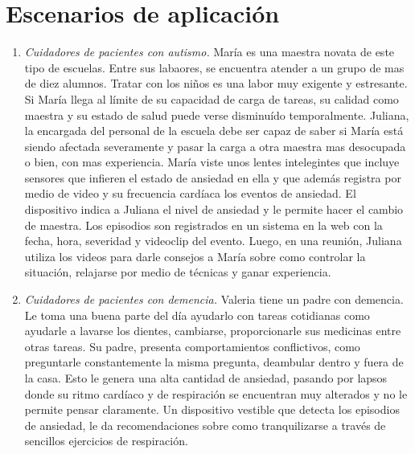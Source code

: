 \documentclass[letterpaper,12pt]{cicese}
\begin{document}
			\section{Escenarios de aplicaci\'on}
				\begin{enumerate}
					\item \emph{Cuidadores de pacientes con autismo.}
					Mar\'ia es una maestra novata de este tipo de escuelas. Entre sus labaores, se encuentra
					atender a un grupo de mas de diez alumnos. Tratar con los ni\~nos es una labor muy exigente y estresante. Si Mar\'ia llega al l\'imite de su capacidad
					de carga de tareas, su calidad como maestra y su estado de salud puede verse disminu\'ido temporalmente. Juliana, la encargada del personal de la
					escuela debe ser capaz de saber si Mar\'ia est\'a siendo afectada severamente y pasar la carga a otra maestra mas desocupada o bien, con mas experiencia. Mar\'ia
					viste unos lentes intelegintes que incluye sensores que infieren el estado de ansiedad en ella y que adem\'as registra por medio de video y su
					frecuencia card\'iaca los eventos de ansiedad. El dispositivo indica a Juliana el nivel de ansiedad y le permite hacer el cambio de maestra. Los episodios son registrados
					en un sistema en la web con la fecha, hora, severidad y videoclip del evento. Luego,
					en una reuni\'on, Juliana utiliza los videos para darle consejos a Mar\'ia sobre como controlar la situaci\'on, relajarse por medio de t\'ecnicas
					y ganar experiencia.
					\item \emph{Cuidadores de pacientes con demencia.}
						Valeria tiene un padre con demencia. Le toma una buena parte del d\'ia ayudarlo
						con tareas cotidianas como ayudarle a lavarse los dientes, cambiarse, proporcionarle sus medicinas entre
						otras tareas. Su padre, presenta comportamientos conflictivos, como preguntarle constantemente la misma pregunta, deambular dentro y fuera de la casa. Esto le genera una alta cantidad de ansiedad, pasando por lapsos donde su ritmo card\'iaco y de respiraci\'on se encuentran muy alterados y no le permite pensar
						claramente. Un dispositivo vestible que detecta los episodios de ansiedad, le da recomendaciones sobre como tranquilizarse a trav\'es de
						sencillos ejercicios de respiraci\'on.
				\end{enumerate}
\end{document}
